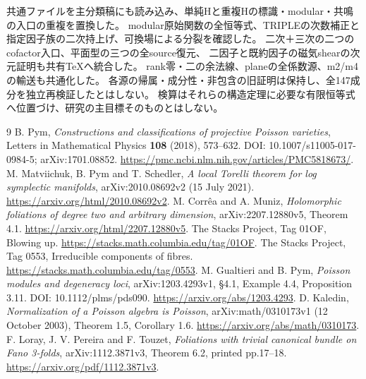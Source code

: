 \documentclass[a4paper,11pt]{ltjsarticle}
\theoremstyle{definition}
\theoremstyle{definition}\newtheorem{definition}[theorem]{定義}
\theoremstyle{remark}\newtheorem{remark}[theorem]{注意}
\begin{document}
共通ファイルを主分類稿にも読み込み、単純Hと重複Hの標識・modular・共鳴の入口の重複を置換した。
modular原始関数の全恒等式、TRIPLEの次数補正と指定因子族の二次持上げ、可換場による分裂を確認した。
二次＋三次の二つのcofactor入口、平面型の三つの全source復元、
二因子と既約因子の磁気shearの次元証明も共有TeXへ統合した。
rank零・二の余法線、planeの全係数源、m2/m4の輸送も共通化した。
各源の帰属・成分性・非包含の旧証明は保持し、全147成分を独立再検証したとはしない。
検算はそれらの構造定理に必要な有限恒等式へ位置づけ、研究の主目標そのものとはしない。

\begin{thebibliography}{9}
 B. Pym, \emph{Constructions and classifications of projective Poisson varieties},
Letters in Mathematical Physics \textbf{108} (2018), 573--632.
DOI: 10.1007/s11005-017-0984-5; arXiv:1701.08852.
\url{https://pmc.ncbi.nlm.nih.gov/articles/PMC5818673/}.
 M. Matviichuk, B. Pym and T. Schedler,
\emph{A local Torelli theorem for log symplectic manifolds},
arXiv:2010.08692v2 (15 July 2021).
\url{https://arxiv.org/html/2010.08692v2}.
 M. Corr\^ea and A. Muniz,
\emph{Holomorphic foliations of degree two and arbitrary dimension},
arXiv:2207.12880v5, Theorem 4.1.
\url{https://arxiv.org/html/2207.12880v5}.
 The Stacks Project, Tag 01OF, Blowing up.
\url{https://stacks.math.columbia.edu/tag/01OF}.
 The Stacks Project, Tag 0553, Irreducible components of fibres.
\url{https://stacks.math.columbia.edu/tag/0553}.
 M. Gualtieri and B. Pym,
\emph{Poisson modules and degeneracy loci}, arXiv:1203.4293v1,
\S4.1, Example 4.4, Proposition 3.11.
DOI: 10.1112/plms/pds090. \url{https://arxiv.org/abs/1203.4293}.
 D. Kaledin,
\emph{Normalization of a Poisson algebra is Poisson},
arXiv:math/0310173v1 (12 October 2003), Theorem 1.5, Corollary 1.6.
\url{https://arxiv.org/abs/math/0310173}.
 F. Loray, J. V. Pereira and F. Touzet,
\emph{Foliations with trivial canonical bundle on Fano 3-folds}, arXiv:1112.3871v3,
Theorem 6.2, printed pp.17--18. \url{https://arxiv.org/pdf/1112.3871v3}.
\end{thebibliography}
\end{document}
